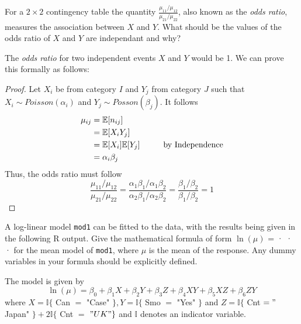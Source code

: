 \documentclass[nocolor]{report}
\begin{document}
\begin{ex}[Question 1b] For a $2\times 2$ contingency table the quantity $\frac{\mu_{11}/\mu_{12}}{\mu_{21}/\mu_{22}}$, also known as the \textit{odds ratio}, measures the association between $X$ and $Y$. What should be the values of the odds ratio of $X$ and $Y$ are independant and why?
\end{ex}
\vspace{-10pt}
\begin{soln}
    The \textit{odds ratio} for two independent events $X$ and $Y$ would be 1. We can prove this formally as follows:
\end{soln}
\begin{proof}
    Let $X_i$ be from category $I$ and $Y_j$ from category $J$ such that $X_i \sim Poisson(\alpha_i)$ and $Y_j \sim Posson(\beta_j)$. It follows 
    \begin{align*}
        \mu_{ij} &= \mathbb{E}[n_{ij}] \\
        &= \mathbb{E}[X_i Y_j] \\
        &= \mathbb{E}[X_i] \mathbb{E}[Y_j] \hspace{10mm} \text{by Independence}\\
        &= \alpha_i \beta_j
    \end{align*}
    Thus, the odds ratio must follow
    $$\frac{\mu_{11} / \mu_{12}}{\mu_{21} / \mu_{22}}=\frac{\alpha_1 \beta_1 / \alpha_1 \beta_2}{\alpha_2 \beta_1 / \alpha_2 \beta_2}=\frac{\beta_1 / \beta_2}{\beta_1 / \beta_2}=1$$
\end{proof}

\newpage
\begin{ex}[Question 2a] 
    A log-linear model \texttt{mod1} can be fitted to the data, with the results being given in the following R output. Give the mathematical formula of form $\ln(\mu)$ = · · · for the mean model of \texttt{mod1}, where $\mu$ is the mean of the response. Any dummy variables in your formula should be explicitly defined.
\end{ex}
\vspace{-10pt}
\begin{soln}
The model is given by
    $$
\ln (\mu)=\beta_0+\beta_1 X+\beta_2 Y+\beta_3 Z+\beta_4 X Y+\beta_5 X Z+\beta_6 Z Y
$$
where $X=\mathbb{I}\{$ Can $=$ "Case" $\}, Y=\mathbb{I}\{$ Smo $=$ "Yes" $\}$ and $Z=\mathbb{I}\{$ Cnt $="$ Japan" $\}+2 \mathbb{I}\{$ Cnt $=$ $" U K "\}$ and $\mathbb{I}$ denotes an indicator variable.
\end{soln}
\end{document}
